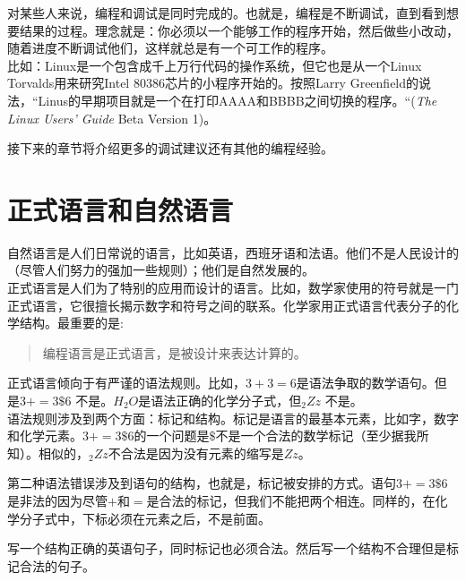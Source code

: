 \documentclass[10pt]{book}
\begin{document}

对某些人来说，编程和调试是同时完成的。也就是，编程是不断调试，直到看到想要结果的过程。理念就是：你必须以一个能够工作的程序开始，然后做些小改动，随着进度不断调试他们，这样就总是有一个可工作的程序。\\

比如：Linux是一个包含成千上万行代码的操作系统，但它也是从一个Linux Torvalds用来研究Intel 80386芯片的小程序开始的。按照Larry Greenfield的说法，“Linus的早期项目就是一个在打印AAAA和BBBB之间切换的程序。“({\em The Linux Users' Guide} Beta Version 1)。


接下来的章节将介绍更多的调试建议还有其他的编程经验。

\section{正式语言和自然语言}

自然语言是人们日常说的语言，比如英语，西班牙语和法语。他们不是人民设计的（尽管人们努力的强加一些规则）；他们是自然发展的。\\

正式语言是人们为了特别的应用而设计的语言。比如，数学家使用的符号就是一门正式语言，它很擅长揭示数字和符号之间的联系。化学家用正式语言代表分子的化学结构。最重要的是:

\begin{quote}
{编程语言是正式语言，是被设计来表达计算的。}
\end{quote}

正式语言倾向于有严谨的语法规则。比如，$3 + 3 = 6$是语法争取的数学语句。但是$3 += 3 \mbox{\$} 6$ 不是。$H_2O$是语法正确的化学分子式，但$_2Zz$ 不是。\\

语法规则涉及到两个方面：标记和结构。标记是语言的最基本元素，比如字，数字和化学元素。$3 += 3 \mbox{\$} 6$的一个问题是$\$$不是一个合法的数学标记（至少据我所知）。相似的，$_2Zz$不合法是因为没有元素的缩写是$Zz$。


第二种语法错误涉及到语句的结构，也就是，标记被安排的方式。语句$3 + = 3 \mbox{\$} 6$是非法的因为尽管$+$和$=$是合法的标记，但我们不能把两个相连。同样的，在化学分子式中，下标必须在元素之后，不是前面。

\begin{ex}
写一个结构正确的英语句子，同时标记也必须合法。然后写一个结构不合理但是标记合法的句子。
\end{ex}
\end{document}
